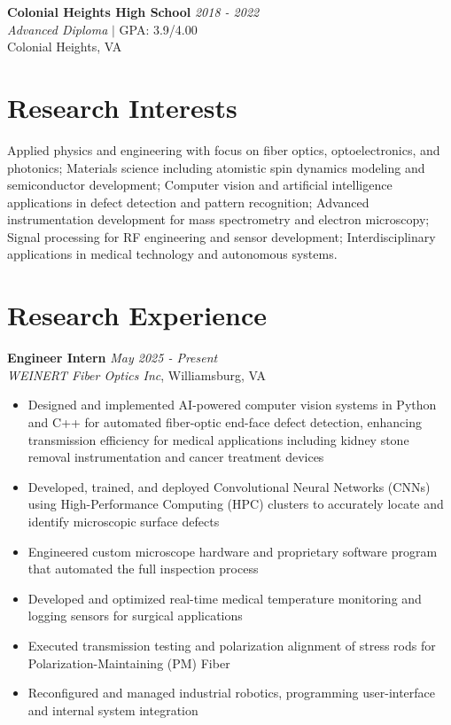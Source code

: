 \documentclass[11pt,letterpaper]{article}
\newcommand{\daterange}[1]{\textit{\color{secondary}#1}}
\newcommand{\position}[1]{\textbf{#1}}
\newcommand{\organization}[1]{\textit{#1}}
\begin{document}
\vspace{8pt}
\noindent
\textbf{Colonial Heights High School} \hfill \daterange{2018 - 2022}\\
\organization{Advanced Diploma} \quad $|$ \quad GPA: 3.9/4.00\\
Colonial Heights, VA

\section{Research Interests}

\noindent
Applied physics and engineering with focus on fiber optics, optoelectronics, and photonics; Materials science including atomistic spin dynamics modeling and semiconductor development; Computer vision and artificial intelligence applications in defect detection and pattern recognition; Advanced instrumentation development for mass spectrometry and electron microscopy; Signal processing for RF engineering and sensor development; Interdisciplinary applications in medical technology and autonomous systems.

\section{Research Experience}

\noindent
\position{Engineer Intern} \hfill \daterange{May 2025 - Present}\\
\organization{WEINERT Fiber Optics Inc}, Williamsburg, VA
\begin{itemize}
    \item Designed and implemented AI-powered computer vision systems in Python and C++ for automated fiber-optic end-face defect detection, enhancing transmission efficiency for medical applications including kidney stone removal instrumentation and cancer treatment devices
    \item Developed, trained, and deployed Convolutional Neural Networks (CNNs) using High-Performance Computing (HPC) clusters to accurately locate and identify microscopic surface defects
    \item Engineered custom microscope hardware and proprietary software program that automated the full inspection process
    \item Developed and optimized real-time medical temperature monitoring and logging sensors for surgical applications
    \item Executed transmission testing and polarization alignment of stress rods for Polarization-Maintaining (PM) Fiber
    \item Reconfigured and managed industrial robotics, programming user-interface and internal system integration
\end{itemize}
\end{document}
